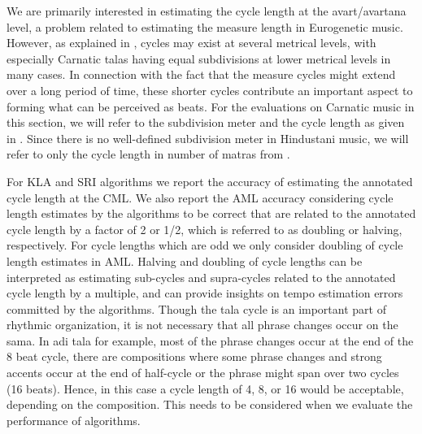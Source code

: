 We are primarily interested in estimating the cycle length at the \gls{avart}/\gls{avartana} level, a problem related to estimating the measure length in Eurogenetic music. However, as explained in , cycles may exist at several metrical levels, with especially Carnatic \glspl{tala} having equal subdivisions at lower metrical levels in many cases. In connection with the fact that the measure cycles might extend over a long period of time, these shorter cycles contribute an important aspect to forming what can be perceived as beats. For the evaluations on Carnatic music in this section, we will refer to the subdivision meter and the cycle length as given in . Since there is no well-defined subdivision meter in Hindustani music, we will refer to only the cycle length in number of \glspl{matra} from .

For \acrshort{KLA} and \acrshort{SRI} algorithms we report the accuracy of estimating the annotated cycle length at the \gls{CML}. We also report the \gls{AML} accuracy considering cycle length estimates by the algorithms to be correct that are related to the annotated cycle length by a factor of 2 or 1/2, which is referred to as doubling or halving, respectively. For cycle lengths which are odd we only consider doubling of cycle length estimates in \gls{AML}. Halving and doubling of cycle lengths can be interpreted as estimating sub-cycles and supra-cycles related to the annotated cycle length by a multiple, and can provide insights on tempo estimation errors committed by the algorithms. Though the \gls{tala} cycle is an important part of rhythmic organization, it is not necessary that all phrase changes occur on the \gls{sama}. In \gls{adi} \gls{tala} for example, most of the phrase changes occur at the end of the 8 beat cycle, there are compositions where some phrase changes and strong accents occur at the end of half-cycle or the phrase might span over two cycles (16 beats). Hence, in this case a cycle length of 4, 8, or 16 would be acceptable, depending on the composition. This needs to be considered when we evaluate the performance of algorithms. 

